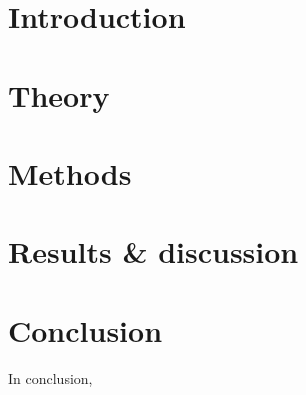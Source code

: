\documentclass[11pt]{article} %
\title{\titlee}
\author{Losito Stefano}
\date{\today}
\begin{document}
	
	\bigskip
		\posttitle{\end{center}}
	
	\maketitle
	
	\newpage
\tableofcontents
\pagebreak

\section{Introduction}

\section{Theory}

\section{Methods}

\section{Results \& discussion}

\section{Conclusion}

In conclusion,


\printbibliography[heading=bibintoc]
\printnoidxglossaries
\listoffigures
\end{document}

